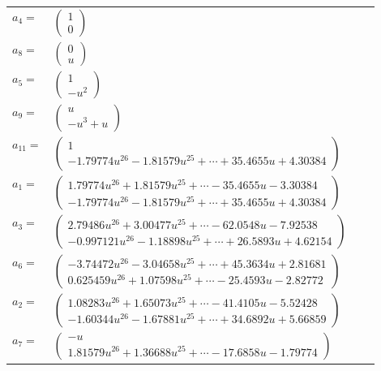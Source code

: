\documentclass[1p]{elsarticle_modified}
\theoremstyle{definition}
\begin{document}
\begin{tabular}{m{7pt} m{180pt} m{7pt} m{180pt} }
\flushright $a_{4}=$&$\begin{pmatrix}1\\0\end{pmatrix}$ \\
\flushright $a_{8}=$&$\begin{pmatrix}0\\u\end{pmatrix}$ \\
\flushright $a_{5}=$&$\begin{pmatrix}1\\- u^2\end{pmatrix}$ \\
\flushright $a_{9}=$&$\begin{pmatrix}u\\- u^3+u\end{pmatrix}$ \\
\flushright $a_{11}=$&$\begin{pmatrix}1\\-1.79774 u^{26}-1.81579 u^{25}+\cdots+35.4655 u+4.30384\end{pmatrix}$ \\
\flushright $a_{1}=$&$\begin{pmatrix}1.79774 u^{26}+1.81579 u^{25}+\cdots-35.4655 u-3.30384\\-1.79774 u^{26}-1.81579 u^{25}+\cdots+35.4655 u+4.30384\end{pmatrix}$ \\
\flushright $a_{3}=$&$\begin{pmatrix}2.79486 u^{26}+3.00477 u^{25}+\cdots-62.0548 u-7.92538\\-0.997121 u^{26}-1.18898 u^{25}+\cdots+26.5893 u+4.62154\end{pmatrix}$ \\
\flushright $a_{6}=$&$\begin{pmatrix}-3.74472 u^{26}-3.04658 u^{25}+\cdots+45.3634 u+2.81681\\0.625459 u^{26}+1.07598 u^{25}+\cdots-25.4593 u-2.82772\end{pmatrix}$ \\
\flushright $a_{2}=$&$\begin{pmatrix}1.08283 u^{26}+1.65073 u^{25}+\cdots-41.4105 u-5.52428\\-1.60344 u^{26}-1.67881 u^{25}+\cdots+34.6892 u+5.66859\end{pmatrix}$ \\
\flushright $a_{7}=$&$\begin{pmatrix}- u\\1.81579 u^{26}+1.36688 u^{25}+\cdots-17.6858 u-1.79774\end{pmatrix}$ \\

\end{tabular}
\end{document}

